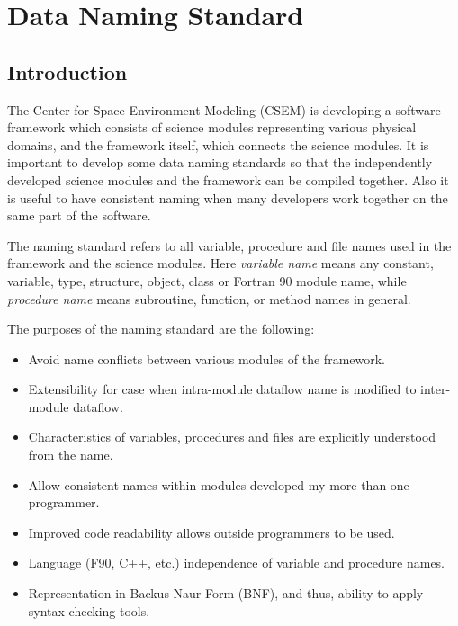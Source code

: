 
\chapter{Data Naming Standard}

%

\section{Introduction}

The Center for Space Environment Modeling (CSEM) is developing
a software framework which consists of science modules representing
various physical domains, and the framework itself, which connects
the science modules. It is important to develop some data naming
standards so that the independently developed science modules 
and the framework can be compiled together. Also it is useful
to have consistent naming when many developers work together
on the same part of the software.

The naming standard refers to all variable, procedure and file names
used in the framework and the science modules.
Here {\it variable name} means any constant, variable, type, structure, 
object, class or Fortran 90 module name, while {\it procedure name} 
means subroutine, function, or method names in general.

The purposes of the naming standard are the following:
\begin{itemize}
\item Avoid name conflicts between various modules of the framework.
\item Extensibility for case when intra-module dataflow name is modified
      to inter-module dataflow.
\item Characteristics of variables, procedures and files are
      explicitly understood from the name.
\item Allow consistent names within modules developed my more than
      one programmer.
\item Improved code readability allows outside programmers to be used.
\item Language (F90, C++, etc.) independence of variable and procedure names.
\item Representation in Backus-Naur Form (BNF), and thus, ability to apply
      syntax checking tools.
\end{itemize}

